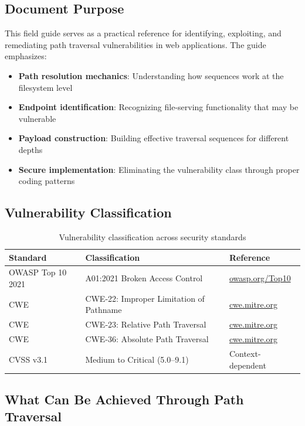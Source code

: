 \documentclass[11pt,letterpaper]{article}
\newcommand{\code}[1]{\texttt{\detokenize{#1}}}
\begin{document}
\subsection{Document Purpose}

This field guide serves as a practical reference for identifying, exploiting, and remediating path traversal vulnerabilities in web applications. The guide emphasizes:

\begin{itemize}
  \item \textbf{Path resolution mechanics}: Understanding how \code{../} sequences work at the filesystem level
  \item \textbf{Endpoint identification}: Recognizing file-serving functionality that may be vulnerable
  \item \textbf{Payload construction}: Building effective traversal sequences for different depths
  \item \textbf{Secure implementation}: Eliminating the vulnerability class through proper coding patterns
\end{itemize}

\subsection{Vulnerability Classification}

\begin{table}[h]
\centering
\begin{tabular}{@{}lll@{}}
\toprule
\textbf{Standard} & \textbf{Classification} & \textbf{Reference} \\
\midrule
OWASP Top 10 2021 & A01:2021 Broken Access Control & \url{owasp.org/Top10} \\
CWE & CWE-22: Improper Limitation of Pathname & \url{cwe.mitre.org} \\
CWE & CWE-23: Relative Path Traversal & \url{cwe.mitre.org} \\
CWE & CWE-36: Absolute Path Traversal & \url{cwe.mitre.org} \\
CVSS v3.1 & Medium to Critical (5.0--9.1) & Context-dependent \\
\bottomrule
\end{tabular}
\caption{Vulnerability classification across security standards}
\end{table}

\subsection{What Can Be Achieved Through Path Traversal}
\end{document}
